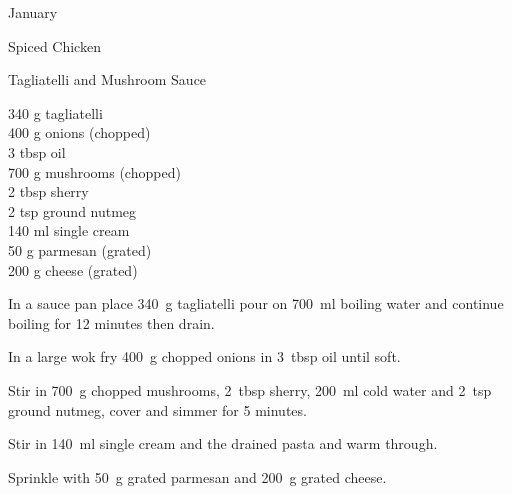 \begin{menu}{January}
\begin{recipe}{2}{Spiced Chicken}
\begin{instructions}
    \end{instructions}
    \end{recipe}%
  
    \begin{recipe}{2}{Tagliatelli and Mushroom Sauce}%
		\begin{ingredients}
		340 g tagliatelli  \\
	400 g onions (chopped) \\
	3 tbsp oil  \\
	700 g mushrooms (chopped) \\
	2 tbsp sherry  \\
	2 tsp ground nutmeg  \\
	140 ml single cream  \\
	50 g parmesan (grated) \\
	200 g cheese (grated) \\
	
		\end{ingredients}
	
	
    \begin{instructions}
    \item 
    In a
    sauce pan
    place
    340~g  tagliatelli
    pour on
    700~ml  boiling water and continue boiling for 12 minutes then drain.
  \item 
        In a large wok fry
        400~g chopped onions
        in
        3~tbsp  oil
        until soft.
      \item 
        Stir in
        700~g chopped mushrooms,
        2~tbsp  sherry,
        200~ml  cold water
        and
        2~tsp  ground nutmeg,
        cover and simmer for 5 minutes.
      \item 
        Stir in
        140~ml  single cream
        and the drained pasta
        and warm through.
      \item 
        Sprinkle with
        50~g grated parmesan
        and
        200~g grated cheese.
      
    \end{instructions}
    \end{recipe}%
  

\end{menu}
